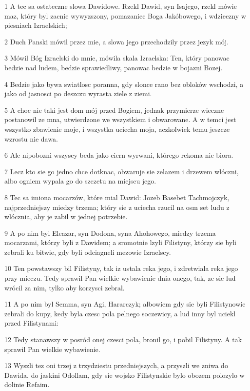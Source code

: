 \par 1 A tec sa ostateczne slowa Dawidowe. Rzekl Dawid, syn Isajego, rzekl mówie maz, który byl zacnie wywyzszony, pomazaniec Boga Jakóbowego, i wdzieczny w piesniach Izraelskich;
\par 2 Duch Panski mówil przez mie, a slowa jego przechodzily przez jezyk mój.
\par 3 Mówil Bóg Izraelski do mnie, mówila skala Izraelska: Ten, który panowac bedzie nad ludem, bedzie sprawiedliwy, panowac bedzie w bojazni Bozej.
\par 4 Bedzie jako bywa swiatlosc poranna, gdy slonce rano bez obloków wschodzi, a jako od jasnosci po deszczu wyrasta ziele z ziemi.
\par 5 A choc nie taki jest dom mój przed Bogiem, jednak przymierze wieczne postanowil ze mna, utwierdzone we wszystkiem i obwarowane. A w temci jest wszystko zbawienie moje, i wszystka uciecha moja, aczkolwiek temu jeszcze wzrostu nie dawa.
\par 6 Ale nipobozni wszyscy beda jako ciern wyrwani, którego rekoma nie biora.
\par 7 Lecz kto sie go jedno chce dotknac, obwaruje sie zelazem i drzewem wlóczni, albo ogniem wypala go do szczetu na miejscu jego.
\par 8 Tec sa imiona mocarzów, które mial Dawid: Jozeb Basebet Tachmojczyk, najprzedniejszy miedzy trzema; który sie z uciecha rzucil na osm set ludu z wlócznia, aby je zabil w jednej potrzebie.
\par 9 A po nim byl Eleazar, syn Dodona, syna Ahohowego, miedzy trzema mocarzami, którzy byli z Dawidem; a sromotnie lzyli Filistyny, którzy sie byli zebrali ku bitwie, gdy byli odciagneli mezowie Izraelscy.
\par 10 Ten powstawszy bil Filistyny, tak iz ustala reka jego, i zdretwiala reka jego przy mieczu. Tedy sprawil Pan wielkie wybawienie dnia onego, tak, ze sie lud wrócil za nim, tylko aby korzysci zebral.
\par 11 A po nim byl Semma, syn Agi, Hararczyk; albowiem gdy sie byli Filistynowie zebrali do kupy, kedy byla czesc pola pelnego soczewicy, a lud inny byl uciekl przed Filistynami:
\par 12 Tedy stanawszy w posród onej czesci pola, bronil go, i pobil Filistyny. A tak sprawil Pan wielkie wybawienie.
\par 13 Wyszli tez oni trzej z trzydziestu przedniejszych, a przyszli we zniwa do Dawida, do jaskini Odollam, gdy sie wojsko Filistynskie bylo obozem polozylo w dolinie Refaim.
